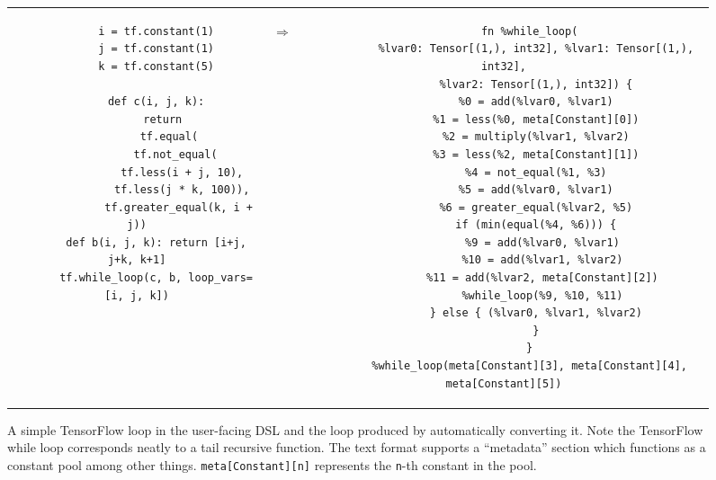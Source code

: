       \begin{figure*}[htb!]
        \begin{tabular}{ccc}
        \begin{minipage}{0.4\textwidth}
        \begin{verbatim}
      i = tf.constant(1)
      j = tf.constant(1)
      k = tf.constant(5)

      def c(i, j, k):
        return
          tf.equal(
            tf.not_equal(
              tf.less(i + j, 10),
              tf.less(j * k, 100)),
             tf.greater_equal(k, i + j))
      def b(i, j, k): return [i+j, j+k, k+1]
      tf.while_loop(c, b, loop_vars=[i, j, k])
        \end{verbatim}
        \end{minipage}
      & \hspace{-2.0em}
      \begin{Huge}
        $\Rightarrow$
      \end{Huge}
      &
        \begin{minipage}{0.5\textwidth}
        \begin{verbatim}
        fn %while_loop(
          %lvar0: Tensor[(1,), int32], %lvar1: Tensor[(1,), int32],
          %lvar2: Tensor[(1,), int32]) {
          %0 = add(%lvar0, %lvar1)
          %1 = less(%0, meta[Constant][0])
          %2 = multiply(%lvar1, %lvar2)
          %3 = less(%2, meta[Constant][1])
          %4 = not_equal(%1, %3)
          %5 = add(%lvar0, %lvar1)
          %6 = greater_equal(%lvar2, %5)
          if (min(equal(%4, %6))) {
            %9 = add(%lvar0, %lvar1)
            %10 = add(%lvar1, %lvar2)
            %11 = add(%lvar2, meta[Constant][2])
            %while_loop(%9, %10, %11)
          } else { (%lvar0, %lvar1, %lvar2)
          }
        }
        %while_loop(meta[Constant][3], meta[Constant][4], meta[Constant][5])
        \end{verbatim}
        \end{minipage}
        \end{tabular}
        \caption{\textmd{
          A simple TensorFlow loop in the user-facing DSL and the \relay
            loop produced by automatically converting it.
          Note the TensorFlow while loop corresponds neatly to a tail recursive
            function.
          The \relay text format supports a ``metadata'' section which functions
            as a constant pool among other things.
          \texttt{meta[Constant][n]} represents the \texttt{n}-th constant in the
            pool.
        }}
        \label{fig:tf_to_relay_loop}
        \end{figure*}

